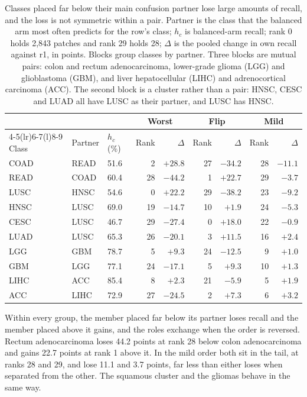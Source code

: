\begin{table}[htbp]
\centering
\small
\setlength{\tabcolsep}{5pt}
\renewcommand{\arraystretch}{1.08}
\begin{tabular}{@{}lllrrrrrr@{}}
\toprule
& & & \multicolumn{2}{c}{Worst} & \multicolumn{2}{c}{Flip} & \multicolumn{2}{c}{Mild} \\
\cmidrule(lr){4-5}\cmidrule(lr){6-7}\cmidrule(l){8-9}
Class & Partner & $h_c$ (\%) & Rank & $\Delta$ & Rank & $\Delta$ & Rank & $\Delta$ \\
\midrule
COAD & READ & 51.6 & 2 & $+28.8$ & 27 & $-34.2$ & 28 & $-11.1$ \\
READ & COAD & 60.4 & 28 & $-44.2$ & 1 & $+22.7$ & 29 & $-3.7$ \\
\addlinespace
LUSC & HNSC & 54.6 & 0 & $+22.2$ & 29 & $-38.2$ & 23 & $-9.2$ \\
HNSC & LUSC & 69.0 & 19 & $-14.7$ & 10 & $+1.9$ & 24 & $-5.3$ \\
CESC & LUSC & 46.7 & 29 & $-27.4$ & 0 & $+18.0$ & 22 & $-0.9$ \\
LUAD & LUSC & 65.3 & 26 & $-20.1$ & 3 & $+11.5$ & 16 & $+2.4$ \\
\addlinespace
LGG & GBM & 78.7 & 5 & $+9.3$ & 24 & $-12.5$ & 9 & $+1.0$ \\
GBM & LGG & 77.1 & 24 & $-17.1$ & 5 & $+9.3$ & 10 & $+1.3$ \\
\addlinespace
LIHC & ACC & 85.4 & 8 & $+2.3$ & 21 & $-5.9$ & 5 & $+1.9$ \\
ACC & LIHC & 72.9 & 27 & $-24.5$ & 2 & $+7.3$ & 6 & $+3.2$ \\
\bottomrule
\end{tabular}
\caption{Classes placed far below their main confusion partner lose large amounts of recall, and the loss is not symmetric within a pair. Partner is the class that the balanced arm most often predicts for the row's class; $h_c$ is balanced-arm recall; rank 0 holds 2,843 patches and rank 29 holds 28; $\Delta$ is the pooled change in own recall against r1, in points. Blocks group classes by partner. Three blocks are mutual pairs: colon and rectum adenocarcinoma, lower-grade glioma (LGG) and glioblastoma (GBM), and liver hepatocellular (LIHC) and adrenocortical carcinoma (ACC). The second block is a cluster rather than a pair: HNSC, CESC and LUAD all have LUSC as their partner, and LUSC has HNSC.}
\label{tab:pairs}
\end{table}

\noindent Within every group, the member placed far below its partner loses recall and the member placed above it gains, and the roles exchange when the order is reversed. Rectum adenocarcinoma loses 44.2 points at rank 28 below colon adenocarcinoma and gains 22.7 points at rank 1 above it. In the mild order both sit in the tail, at ranks 28 and 29, and lose 11.1 and 3.7 points, far less than either loses when separated from the other. The squamous cluster and the gliomas behave in the same way.

